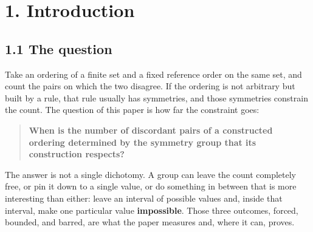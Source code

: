 \documentclass[11pt,a4paper]{article}
\begin{document}
\begin{abstract}
That difference of 5 is decomposed completely over the 19 free orbits and has no culprit: every free orbit deviates, and the deviations nearly cancel. Against a list of candidate structures declared before measuring, one narrows the interval, namely the construction's own pairing involution, which is not affine and so was absent from a group that is exactly its centraliser; none explains the difference. We therefore declare the residue informative relative to that list, and stop.

A landscape of 14 rows over block systems in dimensions three to six populates the three outcomes away from the historical cases and records two refutations of shapes we tried to raise into theorems, one of them of an error of our own.

Every measurement was preceded, in an earlier commit of a public repository, by a written statement of what was going to be measured and, where predictions were made, of what would refute them, and that ordering is checkable.

\end{abstract}

\section*{1. Introduction}

\subsection*{1.1 The question}

Take an ordering of a finite set and a fixed reference order on the same set, and count the pairs on which the two disagree. If the ordering is not arbitrary but built by a rule, that rule usually has symmetries, and those symmetries constrain the count. The question of this paper is how far the constraint goes:

\begin{quote}
\textbf{When is the number of discordant pairs of a constructed ordering determined by the symmetry group that its construction respects?}
\end{quote}

The answer is not a single dichotomy. A group can leave the count completely free, or pin it down to a single value, or do something in between that is more interesting than either: leave an interval of possible values and, inside that interval, make one particular value \textbf{impossible}. Those three outcomes, forced, bounded, and barred, are what the paper measures and, where it can, proves.
\end{document}
